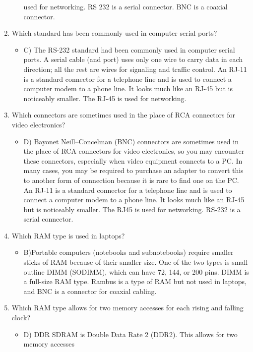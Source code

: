 \documentclass{article}
\begin{document}
\begin{enumerate}
\begin{itemize}
used for networking. RS 232 is a serial connector. BNC is a coaxial connector.
    \end{itemize}
    \item Which standard has been commonly used in computer serial ports?
    \begin{itemize}
        \item C) The RS-232 standard had been commonly used in computer serial ports. A serial
cable (and port) uses only one wire to carry data in each direction; all the rest are wires
for signaling and traffic control. An RJ-11 is a standard connector for a telephone line and
is used to connect a computer modem to a phone line. It looks much like an RJ-45 but is
noticeably smaller. The RJ-45 is used for networking.
    \end{itemize}
    \item Which connectors are sometimes used in the place of RCA connectors for video electronics?
    \begin{itemize}
        \item D) Bayonet Neill–Concelman (BNC) connectors are sometimes used in the place of RCA
connectors for video electronics, so you may encounter these connectors, especially when
video equipment connects to a PC. In many cases, you may be required to purchase an
adapter to convert this to another form of connection because it is rare to find one on the
PC. An RJ-11 is a standard connector for a telephone line and is used to connect a computer
modem to a phone line. It looks much like an RJ-45 but is noticeably smaller. The RJ45 is
used for networking. RS-232 is a serial connector.
    \end{itemize}
    \item Which RAM type is used in laptops?
    \begin{itemize}
        \item B)Portable computers (notebooks and subnotebooks) require smaller sticks of RAM
because of their smaller size. One of the two types is small outline DIMM (SODIMM),
which can have 72, 144, or 200 pins. DIMM is a full-size RAM type. Rambus is a type of
RAM but not used in laptops, and BNC is a connector for coaxial cabling.
    \end{itemize}
    \item Which RAM type allows for two memory accesses for each rising and falling clock?
    \begin{itemize}
        \item D) DDR SDRAM is Double Data Rate 2 (DDR2). This allows for two memory accesses

\end{itemize}
\end{enumerate}
\end{document}
